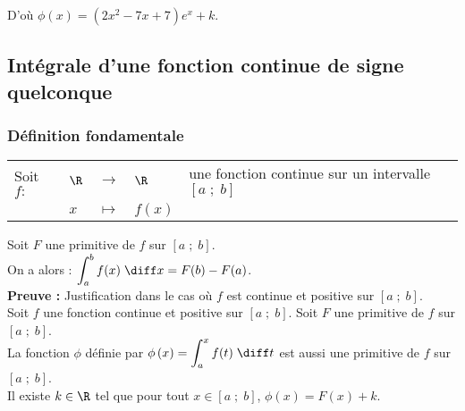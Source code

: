 \vspace*{.3cm}

D'où $\phi\left(x\right) = \left(2x^2-7x+7\right)e^x + k$. \\

\vspace*{-5cm}

\newpage

\subsection{Intégrale d'une fonction continue de signe quelconque}

\subsubsection{Définition fondamentale}

\begin{tabular}{lllll}
\hspace{-.3cm}Soit $f:$ & $\R$ & $\longrightarrow$ & $\R$ & une fonction continue sur un intervalle $\left[a \; ; \; b\right]$ \\
& $x$ & $\longmapsto$ & $f(x)$ & \\
\end{tabular}

\vspace*{.3cm}


Soit $F$ une primitive de $f$ sur $\left[a \; ; \; b\right]$. \\

On a alors : $\displaystyle{\int_a^b f(x) \; \diff x} = F(b) - F(a)$. \\

\textbf{Preuve :} Justification dans le cas où $f$ est continue et positive sur $\left[a \; ; \; b\right]$. \\

Soit $f$ une fonction continue et positive sur $\left[a \; ; \; b\right]$. Soit $F$ une primitive de $f$ sur $\left[a \; ; \; b\right]$. \\

La fonction $\phi$ définie par $\phi\left(x\right) = \displaystyle{\int_a^x f(t) \; \diff t}$ est aussi une primitive de $f$ sur $\left[a \;  ;\; b\right]$. \\

Il existe $k \in \R$ tel que pour tout $x \in \left[a \; ; \; b\right]$, $\phi\left(x\right) = F(x) + k$. \\

